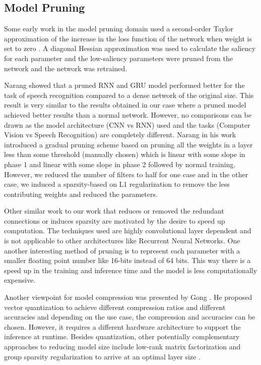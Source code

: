 \subsection{Model Pruning}

Some early work in the model pruning domain used a second-order Taylor approximation of the increase in the loss function of the network when weight is set to zero \cite{lecun1990optimal}. A diagonal Hessian approximation was used to calculate the saliency for each parameter \cite{lecun1990optimal} and the low-saliency parameters were pruned from the network and the network was retrained.


Narang \cite{DBLP:journals/corr/NarangDSE17} showed that a pruned RNN and GRU model performed better for the task of speech recognition compared to a dense network of the original size. This result is very similar to the results obtained in our case where a pruned model achieved better results than a normal network. However, no comparisons can be drawn as the model architecture (CNN vs RNN) used and the tasks (Computer Vision vs Speech Recognition) are completely different.  Narang \cite{DBLP:journals/corr/NarangDSE17} in his work introduced a gradual pruning scheme based on pruning all the weights in a layer
less than some threshold (manually chosen) which is linear with some
slope in phase 1 and linear with some slope in phase 2 followed by
normal training. However, we reduced the number of filters to half for one case and in the other case, we induced a sparsity-based on L1 regularization to remove the less contributing weights and reduced the parameters. 


Other similar work \cite{DBLP:journals/corr/AnwarHS15, DBLP:journals/corr/LebedevGROL14, DBLP:journals/corr/ChangpinyoSZ17} to our work that reduces or removed the redundant connections or induces sparsity are motivated by the desire to speed up computation.
The techniques used are highly convolutional layer dependent and is not applicable to other architectures like Recurrent Neural Networks. 
One another interesting method of pruning is to represent each parameter with a smaller floating point number like 16-bits instead of 64 bits. This way there is a speed up in the training and inference time and the model is less computationally expensive. 

Another viewpoint for model compression was presented by Gong \cite{DBLP:journals/corr/GongLYB14}. He proposed vector quantization to achieve different compression ratios and different accuracies and depending on the use case, the compression and accuracies can be chosen. However, it requires a different hardware architecture to support the inference at runtime. Besides quantization, other potentially complementary approaches to reducing model size include low-rank matrix factorization \cite{denton2014exploiting, DBLP:journals/corr/LebedevGROL14} and group sparsity regularization to arrive at an optimal layer size \cite{DBLP:conf/nips/AlvarezS16}.


